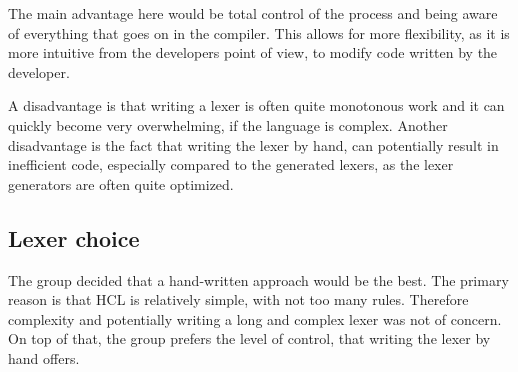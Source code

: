 The main advantage here would be total control of the process and being aware of everything that goes on in the compiler. 
This allows for more flexibility, as it is more intuitive from the developers point of view, to modify code written by the developer.

A disadvantage is that writing a lexer is often quite monotonous work and it can quickly become very overwhelming, if the language is complex.
Another disadvantage is the fact that writing the lexer by hand, can potentially result in inefficient code, especially compared to the generated lexers, as the lexer generators are often quite optimized.

\subsection{Lexer choice}
\label{LexerChoice}
The group decided that a hand-written approach would be the best.
The primary reason is that HCL is relatively simple, with not too many rules.
Therefore complexity and potentially writing a long and complex lexer was not of concern.
On top of that, the group prefers the level of control, that writing the lexer by hand offers.
